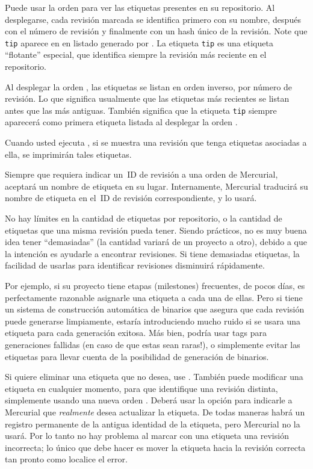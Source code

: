 Puede usar la orden  para ver las etiquetas presentes en
su repositorio. Al desplegarse, cada revisión marcada se identifica
primero con su nombre, después con el número de revisión y finalmente con
un hash único de la revisión.
Note que \texttt{tip} aparece en en listado generado por . La etiqueta
\texttt{tip} es una etiqueta ``flotante'' especial, que identifica siempre
la revisión más reciente en el repositorio.

Al desplegar la orden , las etiquetas se listan en orden
inverso, por número de revisión. Lo que significa usualmente que las
etiquetas más recientes se listan antes que las más antiguas. También
significa que la etiqueta \texttt{tip} siempre aparecerá como primera
etiqueta listada al desplegar la orden .

Cuando usted ejecuta , si se muestra una revisión que tenga 
etiquetas asociadas a ella, se imprimirán tales etiquetas.

Siempre que requiera indicar un~ID de revisión a una orden de
Mercurial, aceptará un nombre de etiqueta en su lugar.  Internamente,
Mercurial traducirá su nombre de etiqueta en el~ID de revisión
correspondiente, y lo usará.

No hay límites en la cantidad de etiquetas por repositorio, o la cantidad
de etiquetas que una misma revisión pueda tener. Siendo prácticos, no es
muy buena idea tener ``demasiadas'' (la cantidad variará de un
proyecto a otro), debido a que la intención es ayudarle a encontrar
revisiones. Si tiene demasiadas etiquetas, la facilidad de usarlas
para identificar revisiones disminuirá rápidamente.

Por ejemplo, si su proyecto tiene etapas (milestones) frecuentes, de pocos
días, es perfectamente razonable asignarle una etiqueta a cada una de
ellas. Pero si tiene un sistema de construcción automática de binarios
que asegura que cada revisión puede generarse limpiamente, estaría
introduciendo mucho ruido si se usara una etiqueta para cada generación
exitosa. Más bien, podría usar tags para generaciones fallidas (en
caso de que estas sean raras!), o simplemente evitar las etiquetas para
llevar cuenta de la posibilidad de generación de binarios.


Si quiere eliminar una etiqueta que no desea, use
.  
También puede modificar una etiqueta en cualquier momento, para que
identifique una revisión distinta, simplemente usando una nueva orden
. Deberá usar la opción  para indicarle a
Mercurial que \emph{realmente} desea actualizar la etiqueta.
De todas maneras habrá un registro permanente de la antigua identidad
de la etiqueta, pero Mercurial no la usará. Por lo tanto no hay
problema al marcar con una etiqueta una revisión incorrecta; lo único
que debe hacer es mover la etiqueta hacia la revisión correcta tan
pronto como localice el error.

